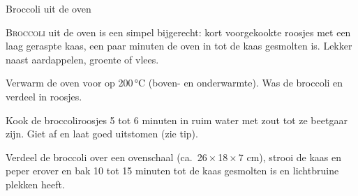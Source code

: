 \begin{recipe}{Broccoli uit de oven}


\lettrine{B}{roccoli} uit de oven is een simpel bijgerecht: kort voorgekookte
roosjes met een laag geraspte kaas, een paar minuten de oven in tot de kaas
gesmolten is. Lekker naast aardappelen, groente of vlees.

\begin{ingredients}
\end{ingredients}

\begin{steps}
  \item Verwarm de oven voor op 200\,°C (boven- en onderwarmte). Was de
        broccoli en verdeel in roosjes.
  \item Kook de broccoliroosjes 5 tot 6 minuten in ruim water met zout tot
        ze beetgaar zijn. Giet af en laat goed uitstomen (zie tip).
  \item Verdeel de broccoli over een ovenschaal (ca.\ 26\,×\,18\,×\,7 cm),
        strooi de kaas en peper erover en bak 10 tot 15 minuten tot de kaas
        gesmolten is en lichtbruine plekken heeft.
\end{steps}

\end{recipe}
